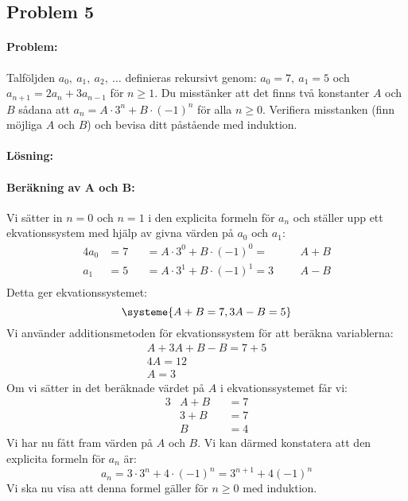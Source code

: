 \subsection*{Problem 5}

\paragraph{Problem:} Talföljden $a_0,\ a_1,\ a_2,\ \dotsc$ definieras rekursivt genom: \newline \(a_0=7,\ a_1 =5\) och \(a_{n+1} = 2a_n + 3a_{n-1}\) för $n\ge 1$. Du misstänker att det finns två konstanter $A$ och $B$ sådana att $a_n =A\cdot 3^n + B\cdot (-1)^n$ för alla $n\ge 0$. Verifiera misstanken (finn möjliga $A$ och $B$) och bevisa ditt påstående med induktion.

\paragraph{Lösning:}

\paragraph{Beräkning av A och B:} Vi sätter in $n=0$ och $n=1$ i den explicita formeln för $a_n$ och ställer upp ett ekvationssystem med hjälp av givna värden på $a_0$ och $a_1$:
\begin{alignat*}{4}
    a_0 &= 7 &&= A\cdot3^0+B\cdot(-1)^0 = &&&A+B \\[5pt]
    a_1 &= 5 &&= A\cdot3^1+B\cdot(-1)^1 = 3&&&A-B \\
\end{alignat*}
Detta ger ekvationssystemet:\\
\[\systeme{A+B = 7, 3A-B = 5}\]
Vi använder additionsmetoden för ekvationssystem för att beräkna variablerna:
\begin{gather*}
A+3A+B-B = 7 + 5 \\[5pt]
4A = 12 \\[5pt]
A = 3
\end{gather*}
Om vi sätter in det beräknade värdet på $A$ i ekvationssystemet får vi:
\begin{alignat*}{3}
&A+B &&= 7 \\[5pt]
&3+B &&= 7 \\[5pt]
&B &&= 4
\end{alignat*}
Vi har nu fått fram värden på $A$ och $B$. Vi kan därmed konstatera att den explicita formeln för $a_n$ är:
\[a_n = 3\cdot 3^n + 4\cdot(-1)^n = 3^{n+1}+4(-1)^n\]
Vi ska nu visa att denna formel gäller för $n\ge 0$ med induktion.

